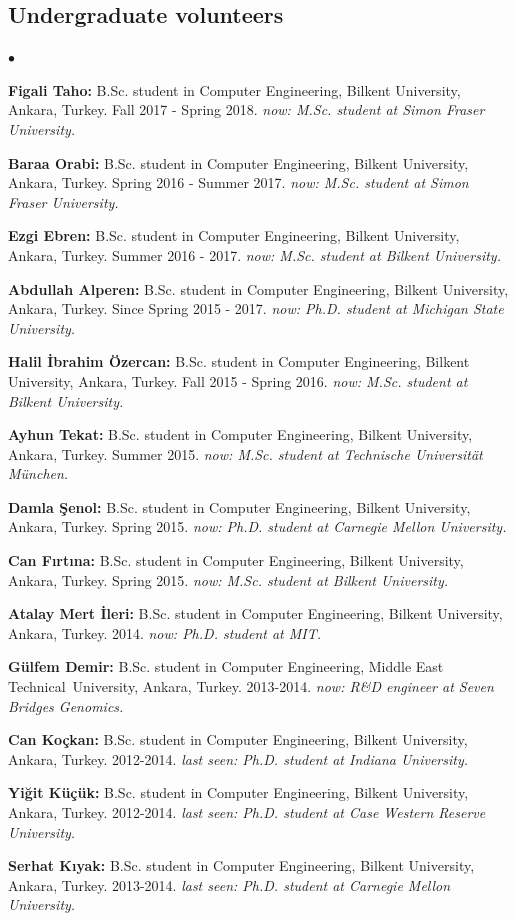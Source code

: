 \documentclass[margin,line]{res}
\newenvironment{list2}{
  \begin{list}{$\bullet$}{%
      \setlength{\itemsep}{0in}
      \setlength{\parsep}{0in} \setlength{\parskip}{0in}
      \setlength{\topsep}{0in} \setlength{\partopsep}{0in} 
      \setlength{\leftmargin}{0.2in}}}{\end{list}}
\begin{document}
\begin{resume}
\subsection{\small \sc Undergraduate volunteers}
\begin{list2}
\item {\bf Figali Taho:} B.Sc. student in Computer Engineering,  Bilkent University, Ankara, Turkey. Fall 2017 - Spring 2018. {\it now: M.Sc. student at Simon Fraser University.}
\item {\bf Baraa Orabi:} B.Sc. student in Computer Engineering,  Bilkent University, Ankara, Turkey. Spring 2016 - Summer 2017. {\it now: M.Sc. student at Simon Fraser University.}
\item {\bf Ezgi Ebren:} B.Sc. student in Computer Engineering,  Bilkent University, Ankara, Turkey. Summer 2016 - 2017. {\it now: M.Sc. student at Bilkent University.}
\item {\bf Abdullah Alperen:} B.Sc. student in Computer Engineering,  Bilkent University, Ankara, Turkey. Since Spring 2015 - 2017. {\it now: Ph.D. student at Michigan State University.}
\item {\bf Halil İbrahim Özercan:} B.Sc. student in Computer Engineering,  Bilkent University, Ankara, Turkey. Fall 2015 - Spring 2016. {\it now: M.Sc. student at Bilkent University.}
\item {\bf Ayhun Tekat:} B.Sc. student in Computer Engineering,  Bilkent University, Ankara, Turkey. Summer 2015. {\it now: M.Sc. student at Technische Universität München.}
\item {\bf Damla Şenol:} B.Sc. student in Computer Engineering,  Bilkent University, Ankara, Turkey. Spring 2015. {\it now: Ph.D. student at Carnegie Mellon University.}
\item {\bf Can Fırtına:} B.Sc. student in Computer Engineering,  Bilkent University, Ankara, Turkey. Spring 2015. {\it now: M.Sc. student at Bilkent University.} 
\item {\bf Atalay Mert İleri:} B.Sc. student in Computer Engineering, Bilkent University, Ankara, Turkey. 2014. {\it now: Ph.D. student at MIT.}
\item {\bf Gülfem Demir:} B.Sc. student in Computer Engineering,  Middle East Technical\ University, Ankara, Turkey. 2013-2014. {\it now: R\&D engineer at Seven Bridges Genomics.}
\item {\bf Can Koçkan:} B.Sc. student in Computer Engineering,  Bilkent University, Ankara, Turkey.  2012-2014. {\it last seen: Ph.D. student at Indiana University.}
\item {\bf Yiğit Küçük:} B.Sc. student in Computer Engineering,  Bilkent University, Ankara, Turkey. 2012-2014. {\it last seen: Ph.D. student at Case Western Reserve University.}
\item {\bf Serhat Kıyak:} B.Sc. student in Computer Engineering,  Bilkent University, Ankara, Turkey. 2013-2014. {\it last seen: Ph.D. student at Carnegie Mellon University.}
\end{list2}



\end{resume}
\end{document}
